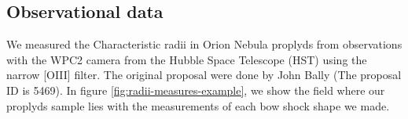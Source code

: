 

 
\subsection{Observational data}

We measured the Characteristic radii in Orion Nebula proplyds from observations with the WPC2 camera from the Hubble Space Telescope (HST) using the narrow [OIII] filter. The original proposal were done by John Bally (The proposal ID is 5469). In figure \ref{fig:radii-measures-example}, we show the field where our proplyds sample lies with the measurements of each bow shock shape we made.

